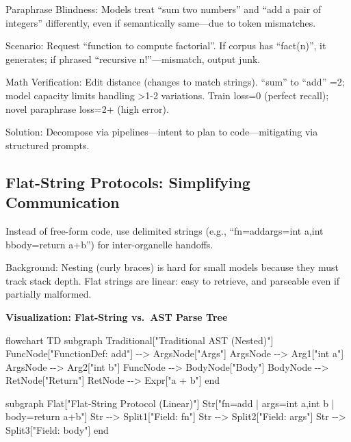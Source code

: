\documentclass[
]{article}
\newenvironment{Shaded}{}{}
\newcommand{\NormalTok}[1]{#1}
\begin{document}
Paraphrase Blindness: Models treat ``sum two numbers'' and ``add a pair
of integers'' differently, even if semantically same---due to token
mismatches.

Scenario: Request ``function to compute factorial''. If corpus has
``fact(n)'', it generates; if phrased ``recursive n!''---mismatch,
output junk.

Math Verification: Edit distance (changes to match strings). ``sum'' to
``add'' =2; model capacity limits handling \textgreater1-2 variations.
Train loss=0 (perfect recall); novel paraphrase loss=2+ (high error).

Solution: Decompose via pipelines---intent to plan to code---mitigating
via structured prompts.

\subsection{Flat-String Protocols: Simplifying
Communication}\label{flat-string-protocols-simplifying-communication}

Instead of free-form code, use delimited strings (e.g.,
``fn=add\textbar args=int a,int b\textbar body=return a+b'') for
inter-organelle handoffs.

Background: Nesting (curly braces) is hard for small models because they
must track stack depth. Flat strings are linear: easy to retrieve, and
parseable even if partially malformed.

\textbf{Visualization: Flat-String vs.~AST Parse Tree}

\begin{Shaded}
\begin{Highlighting}[]
\NormalTok{flowchart TD}
\NormalTok{    subgraph Traditional["Traditional AST (Nested)"]}
\NormalTok{        FuncNode["FunctionDef: add"] {-}{-}\textgreater{} ArgsNode["Args"]}
\NormalTok{        ArgsNode {-}{-}\textgreater{} Arg1["int a"]}
\NormalTok{        ArgsNode {-}{-}\textgreater{} Arg2["int b"]}
\NormalTok{        FuncNode {-}{-}\textgreater{} BodyNode["Body"]}
\NormalTok{        BodyNode {-}{-}\textgreater{} RetNode["Return"]}
\NormalTok{        RetNode {-}{-}\textgreater{} Expr["a + b"]}
\NormalTok{    end}
    
\NormalTok{    subgraph Flat["Flat{-}String Protocol (Linear)"]}
\NormalTok{        Str["fn=add | args=int a,int b | body=return a+b"]}
\NormalTok{        Str {-}{-}\textgreater{} Split1["Field: fn"]}
\NormalTok{        Str {-}{-}\textgreater{} Split2["Field: args"]}
\NormalTok{        Str {-}{-}\textgreater{} Split3["Field: body"]}
\NormalTok{    end}
\end{Highlighting}
\end{Shaded}
\end{document}
